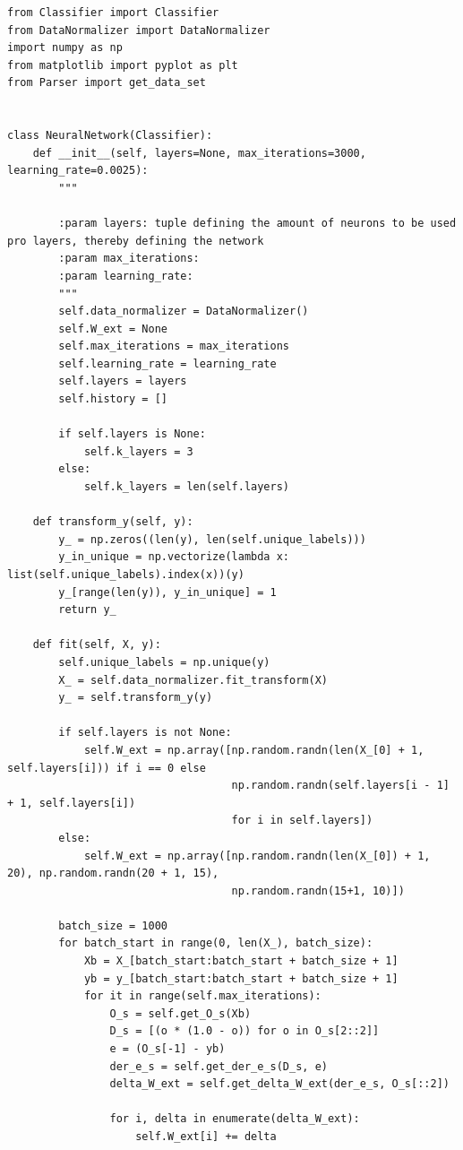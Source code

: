 \begin{lstlisting}[style=py]
from Classifier import Classifier
from DataNormalizer import DataNormalizer
import numpy as np
from matplotlib import pyplot as plt
from Parser import get_data_set


class NeuralNetwork(Classifier):
    def __init__(self, layers=None, max_iterations=3000, learning_rate=0.0025):
        """

        :param layers: tuple defining the amount of neurons to be used pro layers, thereby defining the network
        :param max_iterations:
        :param learning_rate:
        """
        self.data_normalizer = DataNormalizer()
        self.W_ext = None
        self.max_iterations = max_iterations
        self.learning_rate = learning_rate
        self.layers = layers
        self.history = []

        if self.layers is None:
            self.k_layers = 3
        else:
            self.k_layers = len(self.layers)

    def transform_y(self, y):
        y_ = np.zeros((len(y), len(self.unique_labels)))
        y_in_unique = np.vectorize(lambda x: list(self.unique_labels).index(x))(y)
        y_[range(len(y)), y_in_unique] = 1
        return y_

    def fit(self, X, y):
        self.unique_labels = np.unique(y)
        X_ = self.data_normalizer.fit_transform(X)
        y_ = self.transform_y(y)

        if self.layers is not None:
            self.W_ext = np.array([np.random.randn(len(X_[0] + 1, self.layers[i])) if i == 0 else
                                   np.random.randn(self.layers[i - 1] + 1, self.layers[i])
                                   for i in self.layers])
        else:
            self.W_ext = np.array([np.random.randn(len(X_[0]) + 1, 20), np.random.randn(20 + 1, 15),
                                   np.random.randn(15+1, 10)])

        batch_size = 1000
        for batch_start in range(0, len(X_), batch_size):
            Xb = X_[batch_start:batch_start + batch_size + 1]
            yb = y_[batch_start:batch_start + batch_size + 1]
            for it in range(self.max_iterations):
                O_s = self.get_O_s(Xb)
                D_s = [(o * (1.0 - o)) for o in O_s[2::2]]
                e = (O_s[-1] - yb)
                der_e_s = self.get_der_e_s(D_s, e)
                delta_W_ext = self.get_delta_W_ext(der_e_s, O_s[::2])

                for i, delta in enumerate(delta_W_ext):
                    self.W_ext[i] += delta


\end{lstlisting}
